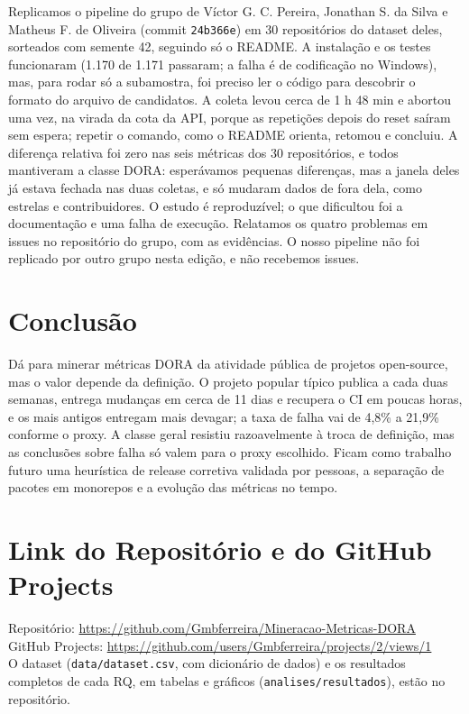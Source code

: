 \documentclass[12pt]{article}
\begin{document}
Replicamos o pipeline do grupo de Víctor G. C. Pereira, Jonathan S. da Silva e
Matheus F. de Oliveira (commit \texttt{24b366e}) em 30 repositórios do dataset
deles, sorteados com semente 42, seguindo só o README. A instalação e os testes
funcionaram (1.170 de 1.171 passaram; a falha é de codificação no Windows), mas,
para rodar só a subamostra, foi preciso ler o código para descobrir o formato do
arquivo de candidatos. A coleta levou cerca de 1 h 48 min e abortou uma vez, na
virada da cota da API, porque as repetições depois do reset saíram sem espera;
repetir o comando, como o README orienta, retomou e concluiu. A diferença
relativa foi zero nas seis métricas dos 30 repositórios, e todos mantiveram a
classe DORA: esperávamos pequenas diferenças, mas a janela deles já estava
fechada nas duas coletas, e só mudaram dados de fora dela, como estrelas e
contribuidores. O estudo é reproduzível; o que dificultou foi a documentação e
uma falha de execução. Relatamos os quatro problemas em issues no repositório
do grupo, com as evidências. O nosso pipeline não foi replicado por outro grupo
nesta edição, e não recebemos issues.

\section{Conclusão}
\label{sec:conclusao}

Dá para minerar métricas DORA da atividade pública de projetos open-source, mas
o valor depende da definição. O projeto popular típico publica a cada duas
semanas, entrega mudanças em cerca de 11 dias e recupera o CI em poucas horas, e
os mais antigos entregam mais devagar; a taxa de falha vai de 4,8\% a 21,9\%
conforme o proxy. A classe geral resistiu razoavelmente à troca de definição,
mas as conclusões sobre falha só valem para o proxy escolhido. Ficam como
trabalho futuro uma heurística de release corretiva validada por pessoas, a
separação de pacotes em monorepos e a evolução das métricas no tempo.

\section*{Link do Repositório e do GitHub Projects}

\noindent Repositório: \url{https://github.com/Gmbferreira/Mineracao-Metricas-DORA}\\
GitHub Projects: \url{https://github.com/users/Gmbferreira/projects/2/views/1}\\
O dataset (\texttt{data/dataset.csv}, com dicionário de dados) e os resultados
completos de cada RQ, em tabelas e gráficos (\texttt{analises/resultados}), estão
no repositório.



\end{document}
